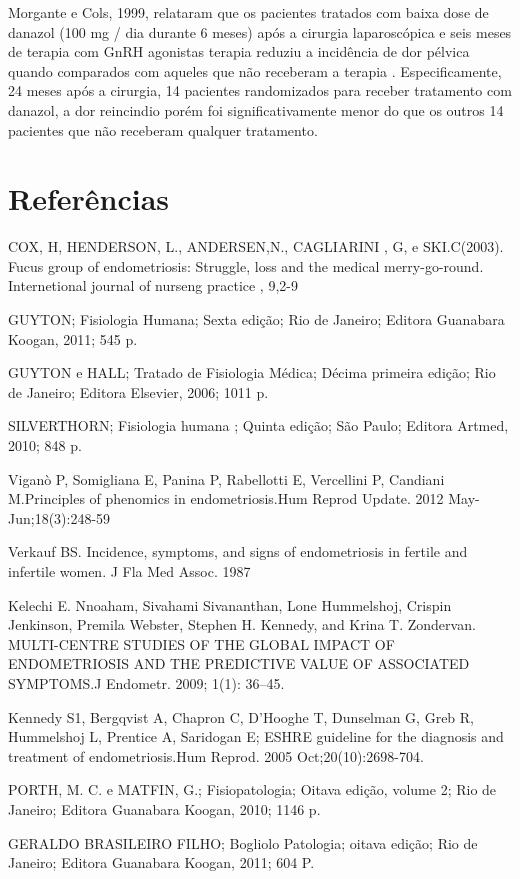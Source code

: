 \documentclass[12pt]{article} %
\begin{document}
Morgante e Cols, 1999, relataram que os pacientes tratados com baixa dose de danazol (100 mg / dia durante 6 meses) após a cirurgia laparoscópica e seis meses de terapia com GnRH agonistas terapia reduziu a incidência de dor pélvica quando comparados com aqueles que não receberam a terapia . Especificamente, 24 meses após a cirurgia, 14 pacientes randomizados para receber tratamento com danazol, a  dor reincindio porém foi significativamente menor do que os outros 14 pacientes que não receberam qualquer tratamento.

\section{Referências} 

COX, H, HENDERSON, L., ANDERSEN,N., CAGLIARINI , G, e SKI.C(2003). Fucus group of endometriosis: Struggle, loss and the medical merry-go-round. Internetional journal of nurseng practice , 9,2-9

GUYTON; Fisiologia Humana; Sexta edição; Rio de Janeiro; Editora Guanabara
Koogan, 2011; 545 p.

GUYTON e HALL; Tratado de Fisiologia Médica; Décima primeira edição; Rio de
Janeiro; Editora Elsevier, 2006; 1011 p.

SILVERTHORN; Fisiologia humana ; Quinta edição; São Paulo; Editora Artmed, 2010; 848 p.

Viganò P, Somigliana E, Panina P, Rabellotti E, Vercellini P, Candiani M.Principles of phenomics in endometriosis.Hum Reprod Update. 2012 May-Jun;18(3):248-59

Verkauf BS. Incidence, symptoms, and signs of endometriosis in fertile and infertile women. J Fla Med Assoc. 1987

Kelechi E. Nnoaham, Sivahami Sivananthan, Lone Hummelshoj, Crispin Jenkinson, Premila Webster, Stephen H. Kennedy, and Krina T. Zondervan. MULTI-CENTRE STUDIES OF THE GLOBAL IMPACT OF ENDOMETRIOSIS AND THE PREDICTIVE VALUE OF ASSOCIATED SYMPTOMS.J Endometr. 2009; 1(1): 36–45. 

Kennedy S1, Bergqvist A, Chapron C, D'Hooghe T, Dunselman G, Greb R, Hummelshoj L, Prentice A, Saridogan E; ESHRE guideline for the diagnosis and treatment of endometriosis.Hum Reprod. 2005 Oct;20(10):2698-704. 


PORTH, M. C. e MATFIN, G.; Fisiopatologia; Oitava edição, volume 2; Rio de
Janeiro; Editora Guanabara Koogan, 2010; 1146 p.

GERALDO BRASILEIRO FILHO; Bogliolo Patologia; oitava edição; Rio de Janeiro; Editora Guanabara Koogan, 2011; 604 P.
\end{document}
